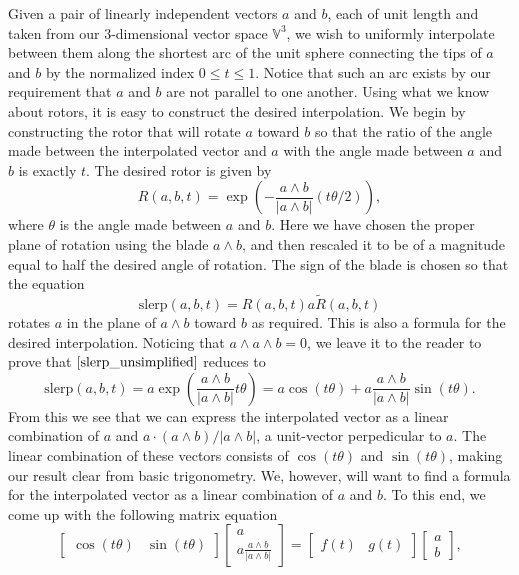 \documentclass{article}
\newcommand{\V}{\mathbb{V}}
\begin{document}
Given a pair of linearly independent vectors $a$ and $b$, each
of unit length and taken from our 3-dimensional
vector space $\V^3$, we wish to uniformly interpolate between them along
the shortest arc of the unit sphere connecting
the tips of $a$ and $b$ by the normalized index $0\leq t\leq 1$.  Notice that
such an arc exists by our requirement that $a$ and $b$ are not parallel to
one another.  Using what we know about rotors, it is easy to
construct the desired interpolation.  We begin by constructing
the rotor that will rotate $a$ toward $b$ so that the ratio
of the angle made between the interpolated vector and $a$ with
the angle made between $a$ and $b$ is exactly $t$.  The desired
rotor is given by
\begin{equation*}
R(a,b,t) = \exp\left(-\frac{a\wedge b}{|a\wedge b|}(t\theta/2)\right),
\end{equation*}
where $\theta$ is the angle made between $a$ and $b$.
Here we have chosen the proper plane of rotation using the
blade $a\wedge b$, and then rescaled it to be of a magnitude
equal to half the desired angle of rotation.  The sign of
the blade is chosen so that the equation
\begin{equation}\label{slerp_unsimplified}
\mbox{slerp}(a,b,t) = R(a,b,t)a\tilde{R}(a,b,t)
\end{equation}
rotates $a$ in the plane of $a\wedge b$ toward $b$ as required.
This is also a formula for the desired interpolation.
Noticing that $a\wedge a\wedge b=0$, we leave it to the
reader to prove that $\eqref{slerp_unsimplified}$ 
reduces to
\begin{equation*}
\mbox{slerp}(a,b,t) = a\exp\left(\frac{a\wedge b}{|a\wedge b|}t\theta\right)
 = a\cos(t\theta) + a\frac{a\wedge b}{|a\wedge b|}\sin(t\theta).
\end{equation*}
From this we see that
we can express the interpolated vector as
a linear combination of $a$ and $a\cdot(a\wedge b)/|a\wedge b|$,
a unit-vector perpedicular to $a$.  The linear combination of
these vectors consists of $\cos(t\theta)$ and $\sin(t\theta)$,
making our result clear from basic trigonometry.  We, however,
will want to find a formula for the interpolated vector as a
linear combination of $a$ and $b$.
To this end, we come up with the following matrix equation
\begin{equation*}
\left[\begin{array}{cc}\cos(t\theta)&\sin(t\theta)\end{array}\right]
\left[\begin{array}{c}a\\a\frac{a\wedge b}{|a\wedge b|}\end{array}\right]
=\left[\begin{array}{cc}f(t)&g(t)\end{array}\right]
\left[\begin{array}{c}a\\b\end{array}\right],
\end{equation*}
\end{document}
